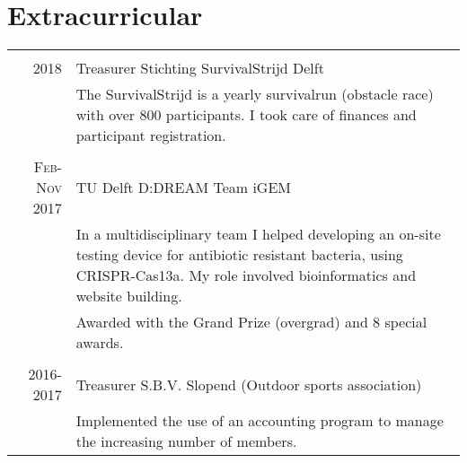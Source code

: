 \documentclass[a4paper,10pt]{article} %
\begin{document}
\begin{tabular}{r|p{13cm}}



\end{tabular}



\section{Extracurricular}

\begin{tabular}{r|p{13cm}}

\multicolumn{2}{c}{} \\
    \textsc{2018} & Treasurer Stichting SurvivalStrijd Delft \\
                  & \footnotesize{The SurvivalStrijd is a yearly survivalrun (obstacle race) with over 800 participants. I took care of finances and participant registration.} \\

\multicolumn{2}{c}{} \\

    \textsc{Feb-Nov 2017} & TU Delft D:DREAM Team iGEM \\
                          & \footnotesize{In a multidisciplinary team I helped developing an on-site testing device for antibiotic resistant bacteria, using CRISPR-Cas13a. My role involved bioinformatics and website building.} \\
                          & \footnotesize{Awarded with the Grand Prize (overgrad) and 8 special awards.} \\
\multicolumn{2}{c}{} \\

    \textsc{2016-2017} & Treasurer S.B.V. Slopend (Outdoor sports association) \\
                       & \footnotesize{Implemented the use of an accounting program to manage the increasing number of members.} \\
\end{tabular}
\end{document}
